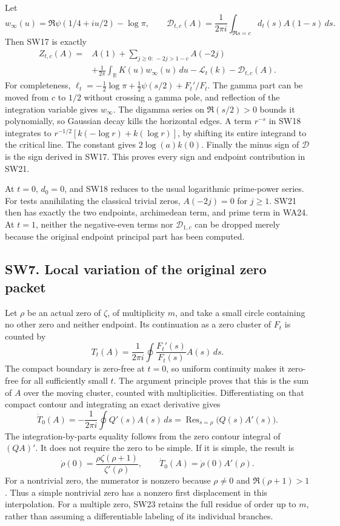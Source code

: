 \documentclass[
  10pt,
  a4paper,
]{article}
\begin{document}
Let \[
w_\infty(u)=\Re\psi(1/4+iu/2)-\log\pi,\qquad
\mathcal D_{t,c}(A)=\frac1{2\pi i}\int_{\Re s=c}d_t(s)A(1-s)\,ds.
\tag{SW20}
\] Then SW17 is exactly \[
\boxed{\begin{aligned}
Z_{t,c}(A)={}&A(1)+\sum_{j\ge0:\,-2j>1-c}A(-2j)\\
&+\frac1{2\pi}\int_{\mathbb R}K(u)w_\infty(u)\,du
-\mathcal L_t(k)-\mathcal D_{t,c}(A).
\end{aligned}}
\tag{SW21}
\] For completeness,
\(\ell_t=-\tfrac12\log\pi+\tfrac12\psi(s/2)+F_t'/F_t\). The gamma part
can be moved from \(c\) to \(1/2\) without crossing a gamma pole, and
reflection of the integration variable gives \(w_\infty\). The digamma
series on \(\Re(s/2)>0\) bounds it polynomially, so Gaussian decay kills
the horizontal edges. A term \(r^{-s}\) in SW18 integrates to
\(r^{-1/2}[k(-\log r)+k(\log r)]\), by shifting its entire integrand to
the critical line. The constant gives \(2\log(a)k(0)\). Finally the
minus sign of \(\mathcal D\) is the sign derived in SW17. This proves
every sign and endpoint contribution in SW21.

At \(t=0\), \(d_0=0\), and SW18 reduces to the usual logarithmic
prime-power series. For tests annihilating the classical trivial zeros,
\(A(-2j)=0\) for \(j\ge1\). SW21 then has exactly the two endpoints,
archimedean term, and prime term in WA24. At \(t=1\), neither the
negative-even terms nor \(\mathcal D_{1,c}\) can be dropped merely
because the original endpoint principal part has been computed.

\subsection{SW7. Local variation of the original zero
packet}\label{sw7.-local-variation-of-the-original-zero-packet}

Let \(\rho\) be an actual zero of \(\zeta\), of multiplicity \(m\), and
take a small circle containing no other zero and neither endpoint. Its
continuation as a zero cluster of \(F_t\) is counted by \[
T_t(A)=\frac1{2\pi i}\oint \frac{F_t'(s)}{F_t(s)}A(s)\,ds.
\tag{SW22}
\] The compact boundary is zero-free at \(t=0\), so uniform continuity
makes it zero-free for all sufficiently small \(t\). The argument
principle proves that this is the sum of \(A\) over the moving cluster,
counted with multiplicities. Differentiating on that compact contour and
integrating an exact derivative gives \[
\dot T_0(A)=-\frac1{2\pi i}\oint Q'(s)A(s)\,ds
=\operatorname {Res}_{s=\rho}\bigl(Q(s)A'(s)\bigr).
\tag{SW23}
\] The integration-by-parts equality follows from the zero contour
integral of \((QA)'\). It does not require the zero to be simple. If it
is simple, the result is \[
\dot\rho(0)=\frac{\rho\zeta(\rho+1)}{\zeta'(\rho)},\qquad
\dot T_0(A)=\dot\rho(0)A'(\rho).
\tag{SW24}
\] For a nontrivial zero, the numerator is nonzero because \(\rho\ne0\)
and \(\Re(\rho+1)>1\). Thus a simple nontrivial zero has a nonzero first
displacement in this interpolation. For a multiple zero, SW23 retains
the full residue of order up to \(m\), rather than assuming a
differentiable labeling of its individual branches.
\end{document}
